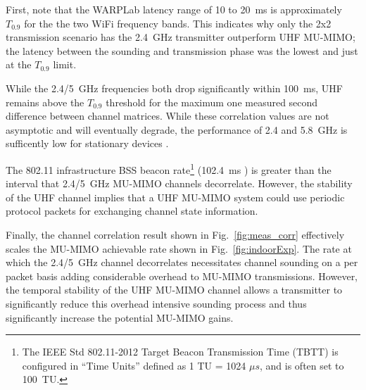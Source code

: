 First, note that the WARPLab latency range of 10 to 20~ms is approximately $T_{0.9}$ for the 
the two WiFi frequency bands.
This indicates why only the 2x2 transmission scenario has the 2.4~GHz transmitter outperform UHF MU-MIMO; the latency between the sounding and transmission phase was the lowest and just at the $T_{0.9}$ limit.

While the 2.4/5~GHz frequencies both drop significantly within 100~ms, UHF remains above the $T_{0.9}$  threshold for the maximum one measured second difference between channel matrices.  
While these correlation values are not asymptotic and will eventually degrade, the performance of 2.4 and 5.8~GHz is sufficently low for stationary devices \cite{breit2009coherence}. 

The 802.11 infrastructure \ac{BSS} beacon rate\footnote{The IEEE Std 802.11-2012 Target Beacon Transmission Time (TBTT) is configured in ``Time Units'' defined as 1 TU = 1024 $\mu s$, and is often set to 100~TU.} (102.4~ms \cite{std11_2012}) is greater than the interval that 2.4/5~GHz MU-MIMO channels decorrelate.  
However, the stability of the UHF channel implies that a UHF MU-MIMO system could use periodic protocol packets for exchanging channel state information. 

Finally, the channel correlation result shown in Fig.~\ref{fig:meas_corr} effectively scales the MU-MIMO achievable rate shown in Fig.~\ref{fig:indoorExp}.
The rate at which the 2.4/5~GHz channel decorrelates necessitates channel sounding on a per packet basis adding considerable overhead to MU-MIMO transmissions. 
However, the temporal stability of the UHF MU-MIMO channel allows a transmitter to significantly reduce this overhead intensive sounding process and thus significantly increase the potential MU-MIMO gains. 


